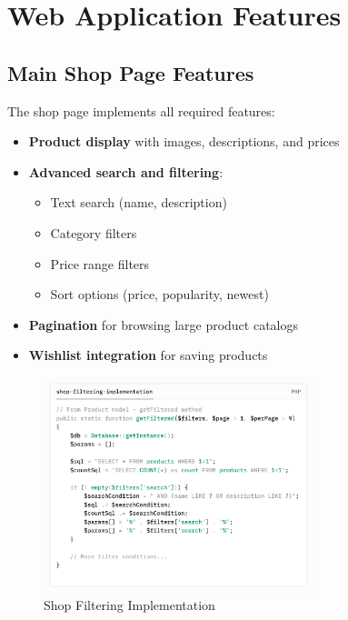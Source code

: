 \documentclass{article}
\begin{document}
\section{Web Application Features}

\subsection{Main Shop Page Features}
The shop page implements all required features:
\begin{itemize}
	\item \textbf{Product display} with images, descriptions, and prices
	\item \textbf{Advanced search and filtering}:
	      \begin{itemize}
		      \item Text search (name, description)
		      \item Category filters
		      \item Price range filters
		      \item Sort options (price, popularity, newest)
	      \end{itemize}
	\item \textbf{Pagination} for browsing large product catalogs
	\item \textbf{Wishlist integration} for saving products
\end{itemize}

\begin{figure}[H]
	\centering
	\includegraphics[width=0.7\textwidth]{images/shop-filtering-implementation.png}
	\caption{Shop Filtering Implementation}
\end{figure}
\end{document}
